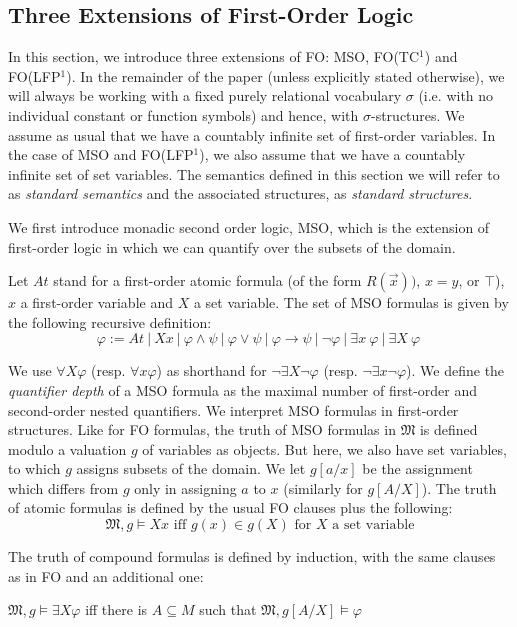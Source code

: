 \documentclass{LMCS}
\newcommand{\frM}{\mathfrak{M}}
\newcommand{\fo}{\textsf{FO}\xspace}
\newcommand{\mso}{\textsf{MSO}\xspace}
\newcommand{\fotc}{\textsf{FO(TC$^1$)}\xspace}
\newcommand{\folfp}{\textsf{FO(LFP$^1$)}\xspace}
\begin{document}
\subsection{Three Extensions of First-Order Logic}
\label{seclog}
In this section, we introduce three extensions of \fo : \mso, \fotc and \folfp. In the remainder of the paper (unless explicitly
stated otherwise), we will always be working with a fixed purely relational vocabulary $\sigma$ (i.e. with no individual constant or function symbols) and hence, with $\sigma$-structures. We assume as usual that we have a countably infinite set of first-order variables. In the case of
\mso and \folfp, we also assume that we have a countably infinite set of set variables. The semantics defined in this section we will refer to as
\textit{standard semantics} and the associated structures, as \textit{standard structures}.


We first introduce monadic second order logic, \mso, which is the
extension of first-order logic in which we can quantify over the subsets of the
domain.
\begin{defi}
[Syntax and semantics of \mso]
    Let $At$ stand for a first-order atomic formula (of the form
    $R(\vec{x}))$, $x=y$, or $\top$), $x$ a first-order variable and $X$ a set
    variable. The set of \mso formulas is given by the following
    recursive definition:
$$\varphi:= At ~|~ Xx ~|~ \varphi \wedge \psi ~|~ \varphi \vee \psi ~|~ \varphi
\rightarrow \psi ~|~ \neg \varphi ~|~ \exists x~ \varphi ~|~ \exists X~
\varphi ~$$


We use $\forall X \varphi$ (resp. $\forall x \varphi$) as shorthand for
$\neg \exists X \neg \varphi$ (resp. $\neg \exists x \neg \varphi$). We
define the \textit{quantifier depth} of a \mso formula as the maximal
number of first-order and second-order nested quantifiers.
We interpret \mso formulas in first-order structures.
Like for \fo formulas, the truth of \mso
formulas in $\frM$ is defined modulo a valuation $g$ of variables
as objects. But here, we also have set variables,
to which $g$ assigns
subsets of the domain. We let $g[a/x]$ be the
assignment which differs from $g$ only in assigning $a$ to $x$ (similarly for $g[A/X]$).
The truth of atomic formulas is defined by the usual
\fo clauses plus the following:
$$\frM, g \models Xx\text{ iff }g(x) \in g(X)\text{ for }X\text{ a set variable}$$

The truth of compound formulas is defined by induction, with the
same clauses as in \fo and an additional one:
\begin{center}
$\frM, g \models \exists X \varphi$ iff there is $A \subseteq M$ such
that $\frM, g[A/X] \models \varphi$
\end{center}
\end{defi}
\end{document}
